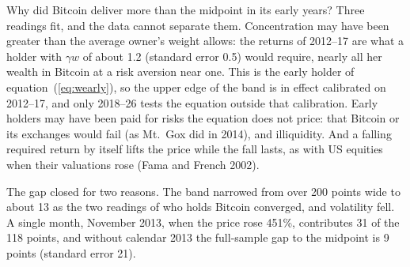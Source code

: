 \documentclass[11pt]{article}
\begin{document}
Why did Bitcoin deliver more than the midpoint in its early years? Three readings fit, and the data cannot separate them. Concentration may have been greater than the average owner's weight allows: the returns of 2012--17 are what a holder with $\gamma w$ of about 1.2 (standard error 0.5) would require, nearly all her wealth in Bitcoin at a risk aversion near one. This is the early holder of equation~(\ref{eq:wearly}), so the upper edge of the band is in effect calibrated on 2012--17, and only 2018--26 tests the equation outside that calibration. Early holders may have been paid for risks the equation does not price: that Bitcoin or its exchanges would fail (as Mt.\ Gox did in 2014), and illiquidity. And a falling required return by itself lifts the price while the fall lasts, as with US equities when their valuations rose (Fama and French 2002).

The gap closed for two reasons. The band narrowed from over 200 points wide to about 13 as the two readings of who holds Bitcoin converged, and volatility fell. A single month, November 2013, when the price rose 451\%, contributes 31 of the 118 points, and without calendar 2013 the full-sample gap to the midpoint is 9 points (standard error 21).
\end{document}
